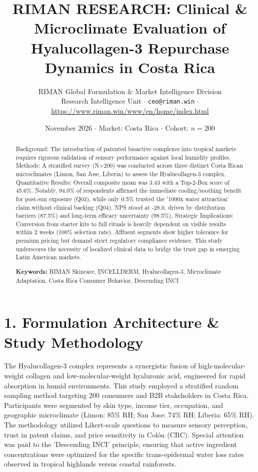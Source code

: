 \documentclass[10pt,twocolumn,a4paper]{article}
\title{\textbf{RIMAN RESEARCH: Clinical \& Microclimate Evaluation of Hyalucollagen-3 Repurchase Dynamics in Costa Rica}}
\author{RIMAN Global Formulation \& Market Intelligence Division\\
\small Research Intelligence Unit $\cdot$ \texttt{ceo@riman.win} $\cdot$ \url{https://www.riman.win/www/en/home/index.html}}
\date{November 2026 \quad $\cdot$ \quad Market: Costa Rica \quad $\cdot$ \quad Cohort: $n = 200$}
\begin{document}
\maketitle

\begin{abstract}
Background: The introduction of patented bioactive complexes into tropical markets requires rigorous validation of sensory performance against local humidity profiles. Methods: A stratified survey (N=200) was conducted across three distinct Costa Rican microclimates (Limon, San Jose, Liberia) to assess the Hyalucollagen-3 complex. Quantitative Results: Overall composite mean was 3.43 with a Top-2-Box score of 45.6\%. Notably, 94.0\% of respondents affirmed the immediate cooling/soothing benefit for post-sun exposure (Q03), while only 0.5\% trusted the '1000x water attraction' claim without clinical backing (Q04). NPS stood at -28.0, driven by distribution barriers (87.5\%) and long-term efficacy uncertainty (98.5\%). Strategic Implications: Conversion from starter kits to full rituals is heavily dependent on visible results within 2 weeks (100\% selection rate). Affluent segments show higher tolerance for premium pricing but demand strict regulatory compliance evidence. This study underscores the necessity of localized clinical data to bridge the trust gap in emerging Latin American markets.

\vspace{0.4em}
\noindent\textbf{Keywords:} RIMAN Skincare, INCELLDERM, Hyalucollagen-3, Microclimate Adaptation, Costa Rica Consumer Behavior, Descending INCI
\end{abstract}

\section{1. Formulation Architecture \& Study Methodology}
The Hyalucollagen-3 complex represents a synergistic fusion of high-molecular-weight collagen and low-molecular-weight hyaluronic acid, engineered for rapid absorption in humid environments. This study employed a stratified random sampling method targeting 200 consumers and B2B stakeholders in Costa Rica. Participants were segmented by skin type, income tier, occupation, and geographic microclimate (Limon: 85\% RH; San Jose: 74\% RH; Liberia: 65\% RH). The methodology utilized Likert-scale questions to measure sensory perception, trust in patent claims, and price sensitivity in Colón (CRC). Special attention was paid to the 'Descending INCI' principle, ensuring that active ingredient concentrations were optimized for the specific trans-epidermal water loss rates observed in tropical highlands versus coastal rainforests.
\end{document}
